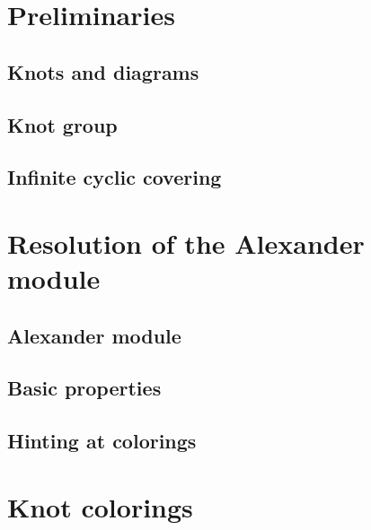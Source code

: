 \documentclass[14pt]{extarticle} %
\begin{document}
\newpage

\section{Preliminaries}

\subsection{Knots and diagrams}



\subsection{Knot group}



\subsection{Infinite cyclic covering}



\section{Resolution of the Alexander module}
\label{section2}

\subsection{Alexander module}
\label{alexander module discussion}



\subsection{Basic properties}



\subsection{Hinting at colorings}



\section{Knot colorings}
\end{document}
